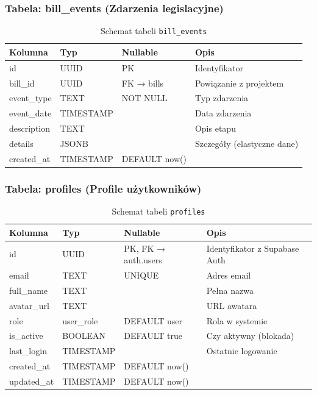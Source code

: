 \documentclass[12pt,a4paper]{article}
\begin{document}
\subsubsection{Tabela: bill\_events (Zdarzenia legislacyjne)}

\begin{table}[H]
\centering
\renewcommand{\arraystretch}{1.3}
\footnotesize
\begin{tabularx}{\textwidth}{l l l X}
\toprule
\textbf{Kolumna} & \textbf{Typ} & \textbf{Nullable} & \textbf{Opis} \\
\midrule
id & UUID & PK & Identyfikator \\
bill\_id & UUID & FK → bills & Powiązanie z projektem \\
event\_type & TEXT & NOT NULL & Typ zdarzenia \\
event\_date & TIMESTAMP & & Data zdarzenia \\
description & TEXT & & Opis etapu \\
details & JSONB & & Szczegóły (elastyczne dane) \\
created\_at & TIMESTAMP & DEFAULT now() & \\
\bottomrule
\end{tabularx}
\caption{Schemat tabeli \texttt{bill\_events}}
\end{table}

\subsubsection{Tabela: profiles (Profile użytkowników)}

\begin{table}[H]
\centering
\renewcommand{\arraystretch}{1.3}
\footnotesize
\begin{tabularx}{\textwidth}{l l l X}
\toprule
\textbf{Kolumna} & \textbf{Typ} & \textbf{Nullable} & \textbf{Opis} \\
\midrule
id & UUID & PK, FK → auth.users & Identyfikator z Supabase Auth \\
email & TEXT & UNIQUE & Adres email \\
full\_name & TEXT & & Pełna nazwa \\
avatar\_url & TEXT & & URL awatara \\
role & user\_role & DEFAULT user & Rola w systemie \\
is\_active & BOOLEAN & DEFAULT true & Czy aktywny (blokada) \\
last\_login & TIMESTAMP & & Ostatnie logowanie \\
created\_at & TIMESTAMP & DEFAULT now() & \\
updated\_at & TIMESTAMP & DEFAULT now() & \\
\bottomrule
\end{tabularx}
\caption{Schemat tabeli \texttt{profiles}}
\end{table}
\end{document}
